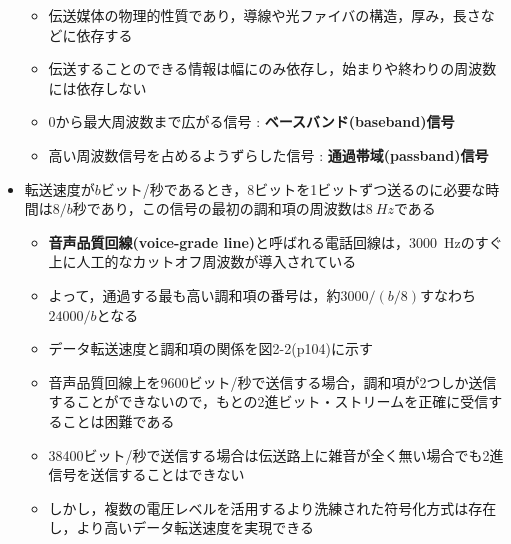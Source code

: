 \documentclass[a4paper]{ltjsarticle}
\begin{document}
\begin{itemize}
\begin{itemize}
					\item 伝送媒体の物理的性質であり，導線や光ファイバの構造，厚み，長さなどに依存する
					\item 伝送することのできる情報は幅にのみ依存し，始まりや終わりの周波数には依存しない
					\item 0から最大周波数まで広がる信号 : \textbf{ベースバンド(baseband)信号}
					\item 高い周波数信号を占めるようずらした信号 : \textbf{通過帯域(passband)信号}
				\end{itemize}
				\item 転送速度が$b$ビット/秒であるとき，8ビットを1ビットずつ送るのに必要な時間は$8/b$秒であり，この信号の最初の調和項の周波数は$\SI{8}{Hz}$である
				\begin{itemize}
					\item \textbf{音声品質回線(voice-grade line)}と呼ばれる電話回線は，\SI{3000}{Hz}のすぐ上に人工的なカットオフ周波数が導入されている
					\item よって，通過する最も高い調和項の番号は，約$3000/(b/8)$すなわち$24000/b$となる
					\item データ転送速度と調和項の関係を図2-2(p104)に示す
					\item 音声品質回線上を9600ビット/秒で送信する場合，調和項が2つしか送信することができないので，もとの2進ビット・ストリームを正確に受信することは困難である
					\item 38400ビット/秒で送信する場合は伝送路上に雑音が全く無い場合でも2進信号を送信することはできない
					\item しかし，複数の電圧レベルを活用するより洗練された符号化方式は存在し，より高いデータ転送速度を実現できる
				\end{itemize}
      \end{itemize}
\end{document}
